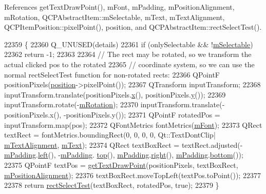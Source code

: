 References get\+Text\+Draw\+Point(), m\+Font, m\+Padding, m\+Position\+Alignment, m\+Rotation, Q\+C\+P\+Abstract\+Item\+::m\+Selectable, m\+Text, m\+Text\+Alignment, Q\+C\+P\+Item\+Position\+::pixel\+Point(), position, and Q\+C\+P\+Abstract\+Item\+::rect\+Select\+Test().


\begin{DoxyCode}
22359 \{
22360   Q\_UNUSED(details)
22361   if (onlySelectable && !\hyperlink{class_q_c_p_abstract_item_ad81eb35c8726a0f458db9df9732e0e41}{mSelectable})
22362     return -1;
22363   
22364   \textcolor{comment}{// The rect may be rotated, so we transform the actual clicked pos to the rotated}
22365   \textcolor{comment}{// coordinate system, so we can use the normal rectSelectTest function for non-rotated rects:}
22366   QPointF positionPixels(\hyperlink{class_q_c_p_item_text_a0d228a00e819022b5690c65762721129}{position}->pixelPoint());
22367   QTransform inputTransform;
22368   inputTransform.translate(positionPixels.\hyperlink{_comparision_pictures_2_createtest_image_8m_a9336ebf25087d91c818ee6e9ec29f8c1}{x}(), positionPixels.\hyperlink{_comparision_pictures_2_createtest_image_8m_a2fb1c5cf58867b5bbc9a1b145a86f3a0}{y}());
22369   inputTransform.rotate(-\hyperlink{class_q_c_p_item_text_ac37df0061552225d2277e1ee3b48f2cb}{mRotation});
22370   inputTransform.translate(-positionPixels.x(), -positionPixels.y());
22371   QPointF rotatedPos = inputTransform.map(pos);
22372   QFontMetrics fontMetrics(\hyperlink{class_q_c_p_item_text_a1dc87fe2a824820d549ffd7e644eef8d}{mFont});
22373   QRect textRect = fontMetrics.boundingRect(0, 0, 0, 0, Qt::TextDontClip|
      \hyperlink{class_q_c_p_item_text_acdb2e50c38e83da00f083771efbd213f}{mTextAlignment}, \hyperlink{class_q_c_p_item_text_a2dec3e08c11f51639629374ecec3bd62}{mText});
22374   QRect textBoxRect = textRect.adjusted(-\hyperlink{class_q_c_p_item_text_ae7b3ef0ce6046efd4b346d28f2e1fb67}{mPadding}.\hyperlink{class_q_c_p_item_text_ab8c6c6e1df36256986fab1463c0a1d38}{left}(), -\hyperlink{class_q_c_p_item_text_ae7b3ef0ce6046efd4b346d28f2e1fb67}{mPadding}.
      \hyperlink{class_q_c_p_item_text_a5c87ee162cbbe3d166b97826c8849304}{top}(), \hyperlink{class_q_c_p_item_text_ae7b3ef0ce6046efd4b346d28f2e1fb67}{mPadding}.\hyperlink{class_q_c_p_item_text_aef159622ce6502412e782a21ba6d84f2}{right}(), \hyperlink{class_q_c_p_item_text_ae7b3ef0ce6046efd4b346d28f2e1fb67}{mPadding}.\hyperlink{class_q_c_p_item_text_a94aeec080f877d3d1d0c3d8ffc10e9e6}{bottom}());
22375   QPointF textPos = \hyperlink{class_q_c_p_item_text_aa6e478b1ce198eace89157c4cacc3ddc}{getTextDrawPoint}(positionPixels, textBoxRect, 
      \hyperlink{class_q_c_p_item_text_a6c27f7dc1a962a04b32430cf99f04654}{mPositionAlignment});
22376   textBoxRect.moveTopLeft(textPos.toPoint());
22377 
22378   return \hyperlink{class_q_c_p_abstract_item_a4c0e14c4e92df91174cb7183fb363069}{rectSelectTest}(textBoxRect, rotatedPos, true);
22379 \}
\end{DoxyCode}


